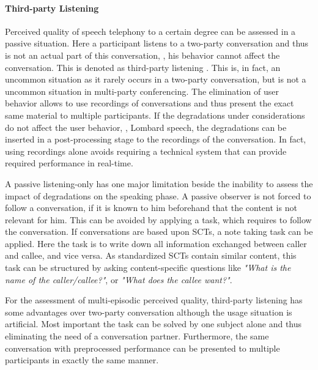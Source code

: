 \paragraph*{Third-party Listening}
Perceived quality of speech telephony to a certain degree can be assessed in a passive situation.
Here a participant listens to a two-party conversation and thus is not an actual part of this conversation, \ie, his behavior cannot affect the conversation.
This is denoted as third-party listening \citep[\cf,][p. 13]{itu-t_p.832:_2000}.
This is, in fact, an uncommon situation as it rarely occurs in a two-party conversation, but is not a uncommon situation in multi-party conferencing.
The elimination of user behavior allows to use recordings of conversations and thus present the exact same material to multiple participants.
If the degradations under considerations do not affect the user behavior, \eg, Lombard speech, the degradations can be inserted in a post-processing stage to the recordings of the conversation.
In fact, using recordings alone avoids requiring a technical system that can provide required performance in real-time.

A passive listening-only has one major limitation beside the inability to assess the impact of degradations on the speaking phase.
A passive observer is not forced to follow a conversation, if it is known to him beforehand that the content is not relevant for him.
This can be avoided by applying a task, which requires to follow the conversation.
If conversations are based upon \acp{SCT}, a note taking task can be applied.
Here the task is to write down all information exchanged between caller and callee, and vice versa.
As standardized \acp{SCT} contain similar content, this task can be structured by asking content-specific questions like \emph{"What is the name of the caller/callee?"}, or \emph{"What does the callee want?"}.

For the assessment of multi-episodic perceived quality, third-party listening has some advantages over two-party conversation although the usage situation is artificial.
Most important the task can be solved by one subject alone and thus eliminating the need of a conversation partner.
Furthermore, the same conversation with preprocessed performance can be presented to multiple participants in exactly the same manner.

